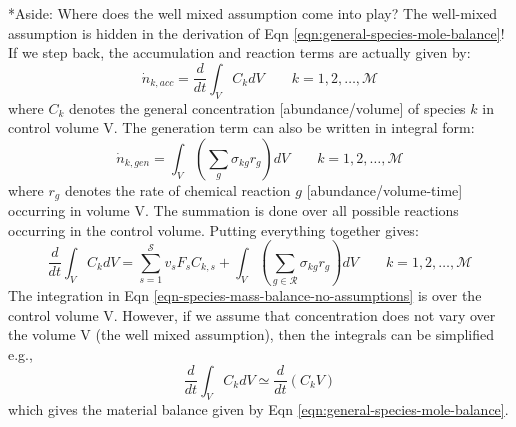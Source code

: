 \documentclass[11pt]{article}
\makeatletter
\theoremstyle{definition}
\renewcommand\subsubsection{\@startsection
	{subsubsection}{2}{0mm}
	{-0.05in}
	{-0.5\baselineskip}
	{\normalfont\normalsize\itshape}}
\makeatother
\begin{document}
\subsubsection*{Aside: Where does the well mixed assumption come into play?}
The well-mixed assumption is hidden in the derivation of Eqn \eqref{eqn:general-species-mole-balance}!
If we step back, the accumulation and reaction terms are actually given by:
\begin{equation}
\dot{n}_{k,acc} = \frac{d}{dt}\int_{V}C_{k}dV\qquad{k=1,2,\hdots,\mathcal{M}}
\end{equation}where $C_{k}$ denotes the general concentration [abundance/volume] of species $k$ in control volume V.
The generation term can also be written in integral form:
\begin{equation}\label{eqn-generation}
	\dot{n}_{k,gen} = \int_{V}\left(\sum_{g}\sigma_{kg}r_{g}\right)dV\qquad{k=1,2,\hdots,\mathcal{M}}
\end{equation}where $r_{g}$ denotes the rate of chemical reaction $g$ [abundance/volume-time] occurring in volume V.
The summation is done over all possible reactions occurring in the control volume.
Putting everything together gives:
\begin{equation}\label{eqn-species-mass-balance-no-assumptions}
	\frac{d}{dt}\int_{V}C_{k}dV = \sum_{s = 1}^{\mathcal{S}}v_{s}F_{s}C_{k,s} + \int_{V}\left(\sum_{g \in \mathcal{R}}\sigma_{kg}r_{g}\right)dV\qquad{k=1,2,\hdots,\mathcal{M}}
\end{equation}
The integration in Eqn \eqref{eqn-species-mass-balance-no-assumptions} is over the control volume V.
However, if we assume that concentration does not vary over the volume V (the well mixed assumption), then the integrals can be simplified e.g.,
\begin{equation}
		\frac{d}{dt}\int_{V}C_{k}dV \simeq \frac{d}{dt}\left(C_{k}V\right)
\end{equation}which gives the material balance given by Eqn \eqref{eqn:general-species-mole-balance}.
\end{document}
